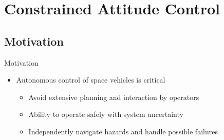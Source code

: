 
\section{Constrained Attitude Control}
\subsection{Motivation}

\begin{frame}[t]{Motivation} %
\begin{itemize}
    \item Autonomous control of space vehicles is critical
    \begin{itemize}
        \item Avoid extensive planning and interaction by operators
        \item Ability to operate safely with system uncertainty 
        \item Independently navigate hazards and handle possible failures
    \end{itemize}
\end{itemize}
\end{frame}
